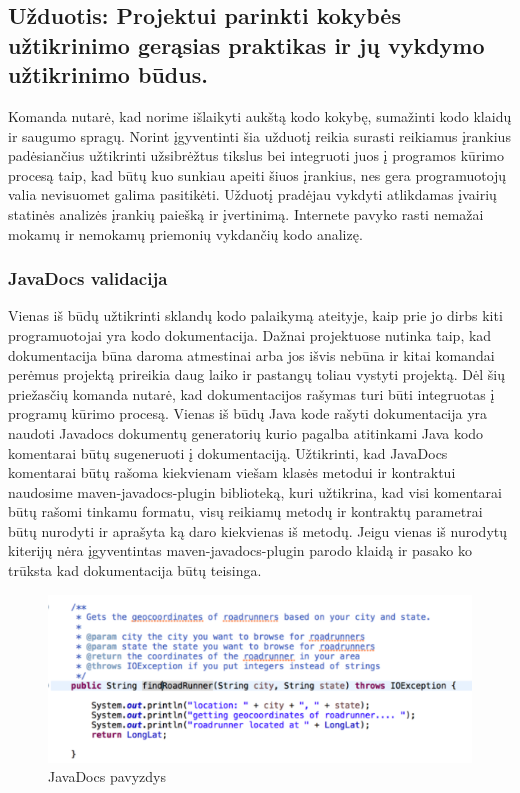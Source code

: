 \documentclass{VUMIFPSkursinis}
\begin{document}
		


	\subsection{Užduotis: Projektui parinkti kokybės užtikrinimo gerąsias praktikas ir jų vykdymo užtikrinimo būdus.}
		Komanda nutarė, kad norime išlaikyti aukštą kodo kokybę, sumažinti kodo klaidų ir saugumo spragų.
		Norint įgyventinti šia užduotį reikia surasti reikiamus įrankius padėsiančius užtikrinti užsibrėžtus tikslus bei integruoti juos į programos kūrimo
		procesą taip, kad būtų kuo sunkiau apeiti šiuos įrankius, nes gera programuotojų valia nevisuomet galima pasitikėti.
		Užduotį pradėjau vykdyti atlikdamas įvairių statinės analizės įrankių paiešką ir įvertinimą.
		Internete pavyko rasti nemažai mokamų ir nemokamų priemonių vykdančių kodo analizę.
		
		\subsubsection{JavaDocs validacija}
			Vienas iš būdų užtikrinti sklandų kodo palaikymą ateityje, kaip prie jo dirbs kiti programuotojai yra kodo dokumentacija.
			Dažnai projektuose nutinka taip, kad dokumentacija būna daroma atmestinai arba jos išvis nebūna ir kitai komandai perėmus projektą prireikia daug 
			laiko ir pastangų toliau vystyti projektą.
			Dėl šių priežasčių komanda nutarė, kad dokumentacijos rašymas turi būti integruotas į programų kūrimo procesą.
			Vienas iš būdų Java kode rašyti dokumentacija yra naudoti Javadocs dokumentų generatorių kurio pagalba atitinkami Java kodo komentarai būtų 
			sugeneruoti į dokumentaciją. 
			Užtikrinti, kad JavaDocs komentarai būtų rašoma kiekvienam viešam klasės metodui ir kontraktui naudosime  maven-javadocs-plugin biblioteką, kuri užtikrina, kad visi komentarai būtų rašomi tinkamu formatu, visų reikiamų metodų ir kontraktų parametrai būtų nurodyti ir aprašyta ką daro kiekvienas iš metodų.
			Jeigu vienas iš nurodytų kiterijų nėra įgyventintas maven-javadocs-plugin parodo klaidą ir pasako ko trūksta kad dokumentacija būtų teisinga.
			\begin{figure}[H]
			\includegraphics[scale=0.7]{img/four}
			\caption{JavaDocs pavyzdys} %
			\label{img:kurimoProcesas}
			\end{figure}
\end{document}
